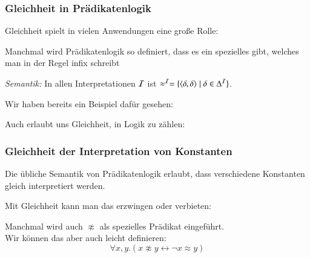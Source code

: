 \documentclass[aspectratio=1610,onlymath]{beamer}
\begin{document}
\begin{frame}\frametitle{Gleichheit in Prädikatenlogik}

Gleichheit spielt in vielen Anwendungen eine große Rolle:\smallskip

Manchmal wird Prädikatenlogik so definiert, dass es ein
spezielles  gibt, welches man in der Regel infix schreibt
\bigskip

\emph{Semantik:} In allen Interpretationen $\mathcal{I}$ ist $\approx^{\mathcal{I}}=\{\langle{\delta,\delta}\rangle\mid \delta\in\Delta^{\mathcal{I}}\}$.
\bigskip\pause

Wir haben bereits ein Beispiel dafür gesehen:

\pause

Auch erlaubt uns Gleichheit, in Logik zu zählen:



\end{frame}

\begin{frame}\frametitle{Gleichheit der Interpretation von Konstanten}

Die übliche Semantik von Prädikatenlogik erlaubt, dass verschiedene 
Konstanten gleich interpretiert werden.\bigskip

Mit Gleichheit kann man das erzwingen oder verbieten:

Manchmal wird auch $\not\approx$ als spezielles Prädikat eingeführt.\\
Wir können das aber auch leicht definieren:
\[ \forall x,y.(x\not\approx y\leftrightarrow \neg x\approx y)\]

\end{frame}
\end{document}
